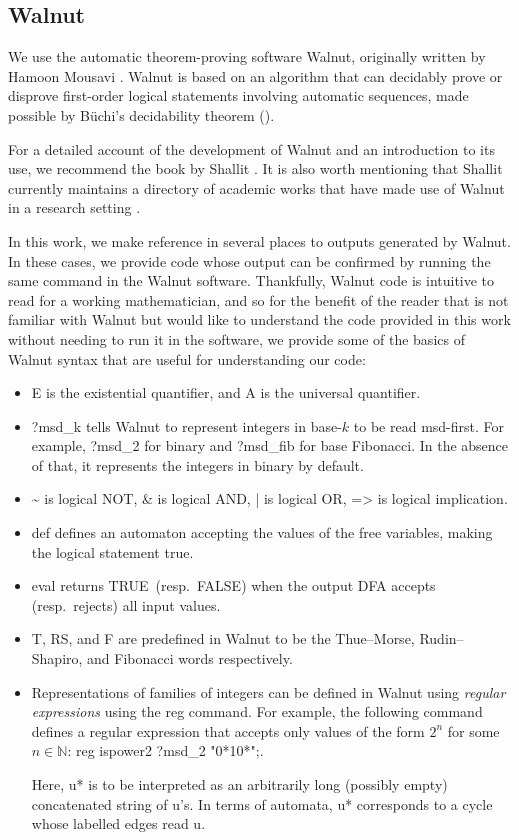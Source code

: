 \documentclass[10pt,a4paper,reqno]{amsart}
\newcommand{\N}{{\mathbb N}}
\newcommand{\walnut}{{\ttfamily Walnut}}
\newcommand{\true}{{\ttfamily TRUE}}
\newcommand{\false}{{\ttfamily FALSE}}
\begin{document}
\subsection{\walnut}
We use the automatic theorem-proving software \walnut{}, originally written by Hamoon Mousavi \cite{mous_walnut}.
\walnut{} is based on an algorithm that can decidably prove or disprove first-order logical statements involving automatic sequences, made possible by B\"uchi's decidability theorem (\cite[Theorem 6.3.2]{shallit2022}).

For a detailed account of the development of \walnut{} and an introduction to its use, we recommend the book by Shallit \cite{shallit2022}. It is also worth mentioning that Shallit currently maintains a directory of academic works that have made use of \walnut{} in a research setting \cite{shallitwalnutwebpage}.

In this work, we make reference in several places to outputs generated by \walnut{}. In these cases, we provide code whose output can be confirmed by running the same command in the \walnut{} software.
Thankfully, \walnut{} code is intuitive to read for a working mathematician, and so for the benefit of the reader that is not familiar with \walnut{} but would like to understand the code provided in this work without needing to run it in the software, we provide some of the basics of \walnut{} syntax that are useful for understanding our code:
\begin{itemize}
    \item {\ttfamily E} is the existential quantifier, and {\ttfamily A} is the universal quantifier.
    \item {\ttfamily ?msd\_k} tells \walnut{} to represent integers in base-$k$ to be read msd-first. For example, {\ttfamily ?msd\_2} for binary and {\ttfamily ?msd\_fib} for base Fibonacci. In the absence of that, it represents the integers in binary by default.
    \item {\ttfamily \textasciitilde} is logical NOT, {\ttfamily \&} is logical AND, {\ttfamily |} is logical OR, {\ttfamily =>} is logical implication.
    \item {\ttfamily def} defines an automaton accepting the values of the free variables, making the logical statement true.
    \item {\ttfamily eval} returns \true \ (resp.~\false) when the output DFA accepts (resp.~rejects) all input values. 
    \item {\ttfamily T}, {\ttfamily RS}, and {\ttfamily F} are predefined in \walnut{} to be the Thue--Morse, Rudin--Shapiro, and Fibonacci words respectively.
	\item Representations of families of integers can be defined in {\walnut} using {\em regular expressions} using the {\ttfamily reg} command. For example, the following command defines a regular expression that accepts only values of the form $2^n$ for some $n\in\N$:
{\ttfamily reg ispower2 ?msd\_2 "0*10*";}.

Here, {\ttfamily u*} is to be interpreted as an arbitrarily long (possibly empty) concatenated string of {\ttfamily u}'s. In terms of automata, {\ttfamily u*} corresponds to a cycle whose labelled edges read {\ttfamily u}.
\end{itemize}
\end{document}
